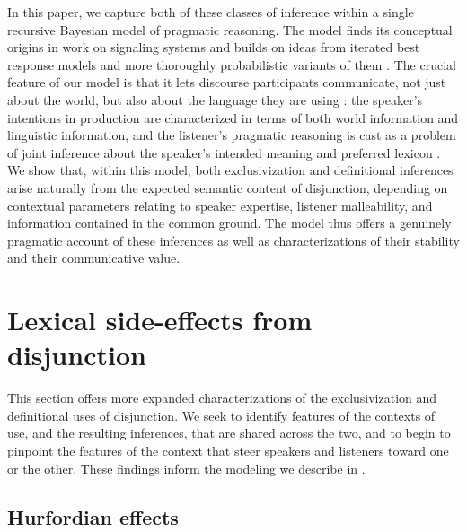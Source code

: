 \documentclass{article}
\begin{document}
In this paper, we capture both of these classes of inference within a
single recursive Bayesian model of pragmatic reasoning. The model
finds its conceptual origins in  work on signaling
systems and builds on ideas from iterated best response models
\citep{Jaeger:2007,Jaeger:2011,Franke09DISS} and more thoroughly
probabilistic variants of them
\citep{CamererHo:2004,Frank:Goodman:2012}. The crucial feature of our
model is that it lets discourse participants communicate, not just
about the world, but also about the language they are using
\citep{Bergen:Goodman:Levy:2012,bergen-levy-goodman:2014}: the
speaker's intentions in production are characterized in terms of both
world information and linguistic information, and the listener's
pragmatic reasoning is cast as a problem of joint inference about the
speaker's intended meaning and preferred lexicon
\citep{Smith:Goodman:Frank:2013}. We show that, within this model,
both exclusivization and definitional inferences arise naturally from
the expected semantic content of disjunction, depending on contextual
parameters relating to speaker expertise, listener malleability, and
information contained in the common ground. The model thus offers a
genuinely pragmatic account of these inferences as well as
characterizations of their stability and their communicative value.


\section{Lexical side-effects from disjunction}\label{sec:data}

This section offers more expanded characterizations of the
exclusivization and definitional uses of disjunction. We seek to
identify features of the contexts of use, and the resulting
inferences, that are shared across the two, and to begin to pinpoint
the features of the context that steer speakers and listeners toward
one or the other. These findings inform the modeling we describe in
.



\subsection{Hurfordian effects}\label{sec:data:overlapping}
\end{document}
